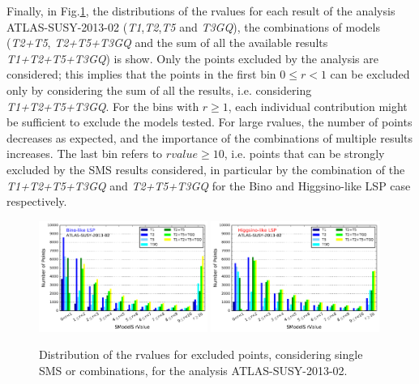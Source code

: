 \documentclass[epj,nopacs,fleqn]{svjour}
\begin{document}
%
Finally, in Fig.\ref{Histos_r}, the distributions of the rvalues for each result of the analysis ATLAS-SUSY-2013-02 (\textit{T1},\textit{T2},\textit{T5} and \textit{T3GQ}), the combinations of models (\textit{T2+T5}, \textit{T2+T5+T3GQ} and the sum of all the available results \textit{T1+T2+T5+T3GQ}) is show. Only the points excluded by the analysis are considered; this implies that the points in the first bin $0\leq r < 1$ can be excluded only by considering the sum of all the results, i.e. considering \textit{T1+T2+T5+T3GQ}. For the bins with $r \geq 1$, each individual contribution might be sufficient to exclude the models tested. For large rvalues, the number of points decreases as expected, and the importance of the combinations of multiple results increases. The last bin refers to $rvalue \geq 10$, i.e. points that can be strongly excluded by the SMS results considered, in particular by the combination of the \textit{T1+T2+T5+T3GQ} and \textit{T2+T5+T3GQ} for the Bino and Higgsino-like LSP case respectively. 
\begin{figure}[b]
\begin{center}
\subfigure
{\includegraphics[width=0.49\textwidth]{PLOTS/Combination/ATLAS-SUSY-2013-02_Bino_rValuesHisto.pdf}}
\subfigure
{\includegraphics[width=0.49\textwidth]{PLOTS/Combination/ATLAS-SUSY-2013-02_Higgsino_rValuesHisto.pdf}}
\end{center}
\caption{Distribution of the rvalues for excluded points, considering single SMS or combinations, for the analysis ATLAS-SUSY-2013-02.} 
\label{Histos_r}
\end{figure}
\end{document}
